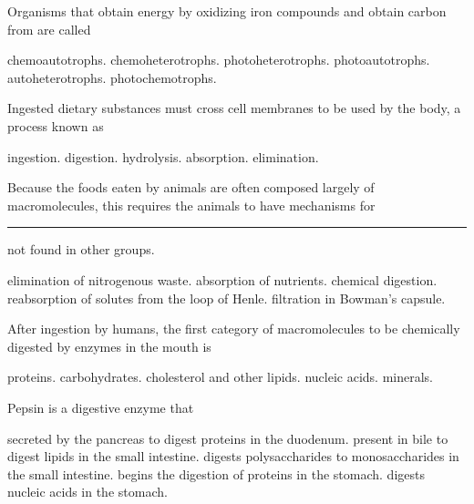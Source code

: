 \question
Organisms that obtain energy by oxidizing iron compounds and obtain carbon from  are called

\begin{choices}
\correctchoice chemoautotrophs. %
\choice chemoheterotrophs. %
\choice photoheterotrophs. %
\choice photoautotrophs. %
\choice autoheterotrophs. %
\choice photochemotrophs. %
\end{choices}

\question
Ingested dietary substances must cross cell membranes to be used by the body, a process known as

\begin{choices}
\choice ingestion. %
\choice digestion. %
\choice hydrolysis. %
\correctchoice absorption. %
\choice elimination. %
\end{choices}

\question
Because the foods eaten by animals are often composed largely of macromolecules, this requires the animals to have mechanisms for \rule{1in}{0.4pt} not found in other groups.

\begin{choices}
\choice elimination of nitrogenous waste. %
\choice absorption of nutrients. %
\correctchoice chemical digestion. %
\choice reabsorption of solutes from the loop of Henle. %
\choice filtration in Bowman's capsule. %
\end{choices}


\question
After ingestion by humans, the first category of macromolecules to be chemically digested by enzymes in the mouth is

\begin{choices}
\choice proteins. %
\correctchoice carbohydrates. %
\choice cholesterol and other lipids. %
\choice nucleic acids. %
\choice minerals. %
\end{choices}

\question
Pepsin is a digestive enzyme that

\begin{choices}
\choice secreted by the pancreas to digest proteins in the duodenum. %
\choice present in bile to digest lipids in the small intestine. %
\choice digests polysaccharides to monosaccharides in the small intestine. %
\correctchoice begins the digestion of proteins in the stomach. %
\choice digests nucleic acids in the stomach. %
\end{choices}

